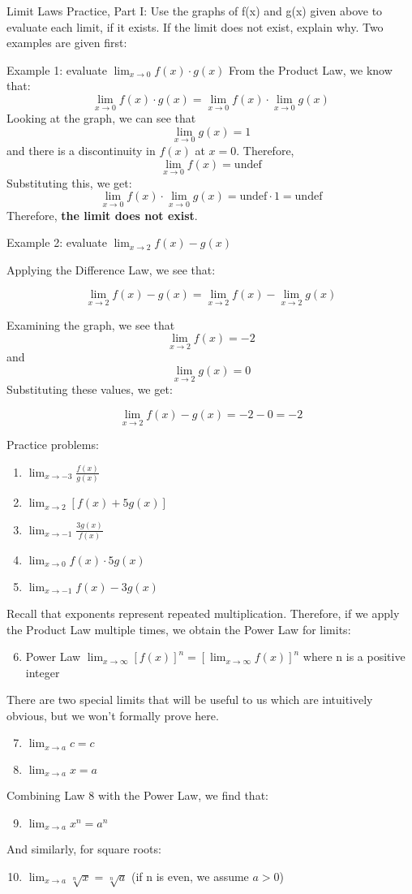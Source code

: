 Limit Laws Practice, Part I:
Use the graphs of f(x) and g(x) given above to evaluate each limit, if it exists. If the limit does not exist, explain why. Two examples are given first:

Example 1: evaluate $\lim_{x\to0} f(x) \cdot g(x)$
From the Product Law, we know that:
$$\lim_{x\to0} f(x) \cdot g(x) = \lim_{x\to0}f(x) \cdot \lim_{x\to0} g(x)$$
Looking at the graph, we can see that $$\lim_{x\to0}g(x) = 1$$ and there is a discontinuity in $f(x)$ at $x=0$. Therefore, $$\lim_{x\to0}f(x) = \text{undef}$$ Substituting this, we get: $$\lim_{x\to0}f(x) \cdot \lim_{x\to0} g(x) = \text{undef} \cdot 1 = \text{undef}$$ Therefore, \textbf{the limit does not exist}. 

Example 2: evaluate $\lim_{x\to2}f(x) - g(x)$

Applying the Difference Law, we see that:

$$\lim_{x\to2}f(x) - g(x) = \lim_{x\to2}f(x) - \lim_{x\to2}g(x)$$

Examining the graph, we see that $$\lim_{x\to2}f(x) = -2$$ and $$\lim_{x\to2}g(x) = 0$$ Substituting these values, we get:

$$\lim_{x\to2}f(x) - g(x) = -2 - 0 = -2$$

Practice problems:
\begin{enumerate}
    \item $\lim_{x\to-3} \frac{f(x)}{g(x)}$
    \item $\lim_{x\to2}\left[f(x) + 5g(x)\right]$
    \item $\lim_{x\to-1} \frac{3g(x)}{f(x)}$
    \item $\lim_{x\to0}f(x) \cdot 5g(x)$
    \item $\lim_{x\to-1} f(x) - 3g(x) $
\end{enumerate}

Recall that exponents represent repeated multiplication. Therefore, if we apply the Product Law multiple times, we obtain the Power Law for limits:
\begin{enumerate}
    \setcounter{enumi}{5}
    \item Power Law $\lim_{x\to\infty} \left[f(x)\right]^n = \left[\lim_{x\to\infty}f(x)\right]^n$ where n is a positive integer
\end{enumerate}
There are two special limits that will be useful to us which are intuitively obvious, but we won't formally prove here.  
\begin{enumerate}
    \setcounter{enumi}{6}
    \item $\lim_{x\to a} \textit{c} = \textit{c}$
    \item $\lim_{x\to a} x = a$
\end{enumerate}
Combining Law 8 with the Power Law, we find that:
\begin{enumerate}
\setcounter{enumi}{8}
    \item $\lim_{x\to a} x^n = a^n$
\end{enumerate}
And similarly, for square roots:
\begin{enumerate}
    \setcounter{enumi}{9}
    \item $\lim_{x\to a} \sqrt[n]{x} = \sqrt[n]{a}$ (if n is even, we assume $a > 0$)
\end{enumerate}

